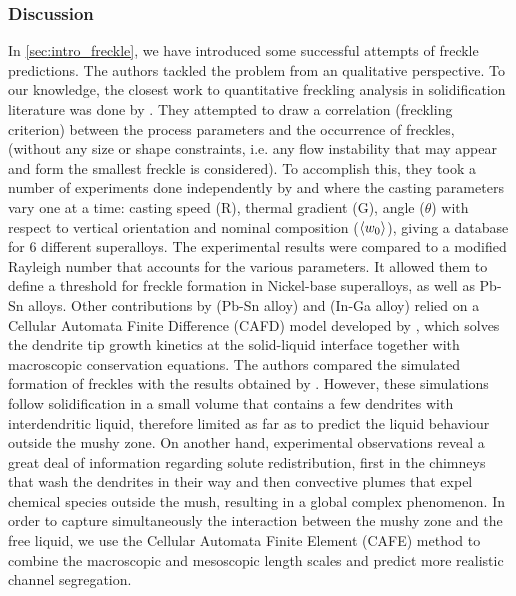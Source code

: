 \subsubsection{Discussion}
In \cref{sec:intro_freckle}, we have introduced some successful attempts of freckle predictions. 
The authors tackled the problem from an qualitative perspective. 
To our knowledge, the closest work to quantitative freckling analysis in solidification literature was done by \citet{ramirez_evaluation_2003}.
They attempted to draw a correlation (freckling criterion) between the process parameters and the occurrence of freckles, 
(without any size or shape constraints, i.e. any flow instability that may appear and form the smallest freckle is considered). 
To accomplish this, they took a number of experiments done independently by \citet{pollock_breakdown_1996} and \citet{auburtin_freckle_2000} 
where the casting parameters vary one at a time: casting speed (R), thermal gradient (G), angle ($\theta$) with respect to vertical 
orientation and nominal composition ($\left \langle w_0 \right \rangle$), giving a database for 6 different superalloys. The experimental results were 
compared to a modified Rayleigh number that accounts for the various parameters. It allowed them to define a threshold for freckle 
formation in Nickel-base superalloys, as well as Pb-Sn alloys.
Other contributions by \citet{yuan_new_2012} (Pb-Sn alloy) and  \citet{karagadde_3-d_2014} (In-Ga alloy) relied on a Cellular Automata Finite Difference
(CAFD) model developed by \citet{lee_modeling_2002}, which  solves the dendrite tip growth kinetics at 
the solid-liquid interface together with macroscopic conservation equations. 
The authors compared the simulated formation of freckles with the results obtained by \citet{shevchenko_chimney_2013}.
However, these simulations follow solidification in a small volume that contains a few dendrites with interdendritic liquid, 
therefore limited as far as to predict the liquid behaviour outside the mushy zone.
On another hand, experimental observations reveal a great deal of information 
regarding solute redistribution, first in the chimneys that wash the dendrites in their 
way and then convective plumes that expel chemical species outside the mush, resulting in a global complex phenomenon.
In order to capture simultaneously the interaction between the mushy zone and the free liquid, we use 
the Cellular Automata Finite Element (CAFE) method to combine the macroscopic and mesoscopic length scales
and predict more realistic channel segregation.
%
